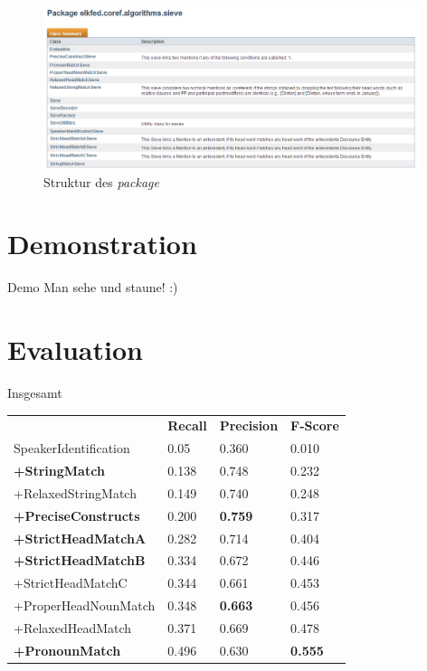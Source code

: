 \documentclass[11pt,a4paper]{beamer}
\begin{document}
\begin{frame}
\begin{figure}
\begin{center}
\includegraphics[width=11cm]{package_sieve.png}
\caption{Struktur des \textit{package}}
\label{fig:repository}
\end{center}
\end{figure}
\end{frame}


\section{Demonstration}
\begin{frame}{Demo}
Man sehe und staune! :)
\end{frame}


\section{Evaluation}
\begin{frame}{Insgesamt}
\begin{table}[h]
\begin{tabular}{llll}
                            & \textbf{Recall} & \textbf{Precision} & \textbf{F-Score} \\
SpeakerIdentification       & 0.05            & 0.360              & 0.010            \\
\textbf{+StringMatch}       & 0.138           & 0.748              & 0.232            \\
+RelaxedStringMatch         & 0.149           & 0.740              & 0.248            \\
\textbf{+PreciseConstructs} & 0.200           & \textbf{0.759}     & 0.317            \\
\textbf{+StrictHeadMatchA}  & 0.282           & 0.714              & 0.404            \\
\textbf{+StrictHeadMatchB}  & 0.334           & 0.672              & 0.446            \\
+StrictHeadMatchC           & 0.344           & 0.661              & 0.453            \\
+ProperHeadNounMatch        & 0.348           & \textbf{0.663}     & 0.456            \\
+RelaxedHeadMatch           & 0.371           & 0.669              & 0.478            \\
\textbf{+PronounMatch}      & 0.496           & 0.630              & \textbf{0.555}       
\end{tabular}
\end{table}
\end{frame}
\end{document}
